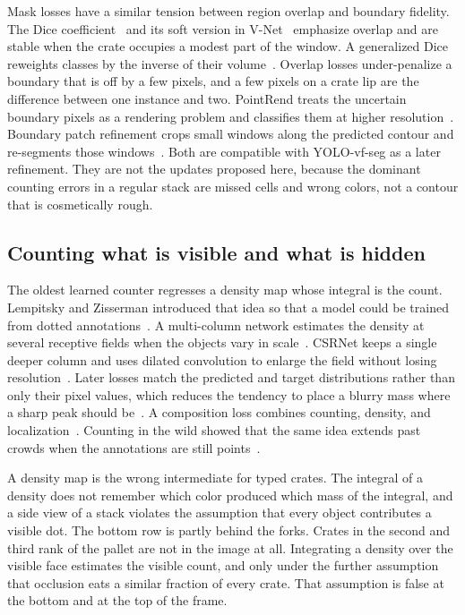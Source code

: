 Mask losses have a similar tension between region overlap and boundary fidelity. The Dice coefficient~\cite{dice1945} and its soft version in V-Net~\cite{milletari2016vnet} emphasize overlap and are stable when the crate occupies a modest part of the window. A generalized Dice reweights classes by the inverse of their volume~\cite{sudre2017gdice}. Overlap losses under-penalize a boundary that is off by a few pixels, and a few pixels on a crate lip are the difference between one instance and two. PointRend treats the uncertain boundary pixels as a rendering problem and classifies them at higher resolution~\cite{kirillov2020pointrend}. Boundary patch refinement crops small windows along the predicted contour and re-segments those windows~\cite{tang2021bpr}. Both are compatible with YOLO-vf-seg as a later refinement. They are not the updates proposed here, because the dominant counting errors in a regular stack are missed cells and wrong colors, not a contour that is cosmetically rough.

\subsection{Counting what is visible and what is hidden}
\label{sec:counting-principles}

The oldest learned counter regresses a density map whose integral is the count. Lempitsky and Zisserman introduced that idea so that a model could be trained from dotted annotations~\cite{lempitsky2010count}. A multi-column network estimates the density at several receptive fields when the objects vary in scale~\cite{zhang2016mcnn}. CSRNet keeps a single deeper column and uses dilated convolution to enlarge the field without losing resolution~\cite{li2018csrnet}. Later losses match the predicted and target distributions rather than only their pixel values, which reduces the tendency to place a blurry mass where a sharp peak should be~\cite{wang2020dmcount}. A composition loss combines counting, density, and localization~\cite{idrees2018composition}. Counting in the wild showed that the same idea extends past crowds when the annotations are still points~\cite{arteta2016counting}.

A density map is the wrong intermediate for typed crates. The integral of a density does not remember which color produced which mass of the integral, and a side view of a stack violates the assumption that every object contributes a visible dot. The bottom row is partly behind the forks. Crates in the second and third rank of the pallet are not in the image at all. Integrating a density over the visible face estimates the visible count, and only under the further assumption that occlusion eats a similar fraction of every crate. That assumption is false at the bottom and at the top of the frame.

